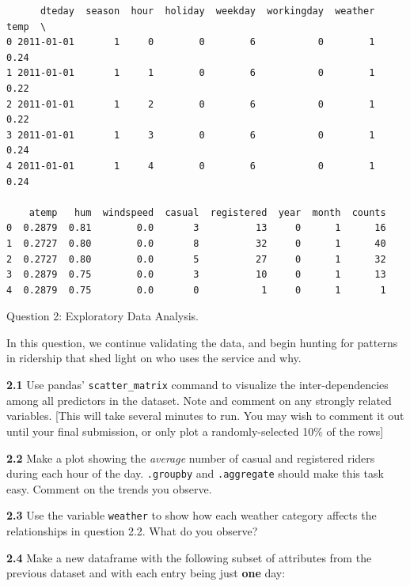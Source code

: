 \documentclass[11pt]{article}
\begin{document}
    
    \begin{verbatim}
      dteday  season  hour  holiday  weekday  workingday  weather  temp  \
0 2011-01-01       1     0        0        6           0        1  0.24   
1 2011-01-01       1     1        0        6           0        1  0.22   
2 2011-01-01       1     2        0        6           0        1  0.22   
3 2011-01-01       1     3        0        6           0        1  0.24   
4 2011-01-01       1     4        0        6           0        1  0.24   

    atemp   hum  windspeed  casual  registered  year  month  counts  
0  0.2879  0.81        0.0       3          13     0      1      16  
1  0.2727  0.80        0.0       8          32     0      1      40  
2  0.2727  0.80        0.0       5          27     0      1      32  
3  0.2879  0.75        0.0       3          10     0      1      13  
4  0.2879  0.75        0.0       0           1     0      1       1  
    \end{verbatim}

    
     Question 2: Exploratory Data Analysis.

In this question, we continue validating the data, and begin hunting for
patterns in ridership that shed light on who uses the service and why.

\textbf{2.1} Use pandas' \texttt{scatter\_matrix} command to visualize
the inter-dependencies among all predictors in the dataset. Note and
comment on any strongly related variables. {[}This will take several
minutes to run. You may wish to comment it out until your final
submission, or only plot a randomly-selected 10\% of the rows{]}

\textbf{2.2} Make a plot showing the \emph{average} number of casual and
registered riders during each hour of the day. \texttt{.groupby} and
\texttt{.aggregate} should make this task easy. Comment on the trends
you observe.

\textbf{2.3} Use the variable \texttt{weather} to show how each weather
category affects the relationships in question 2.2. What do you observe?

\textbf{2.4} Make a new dataframe with the following subset of
attributes from the previous dataset and with each entry being just
\textbf{one} day:
\end{document}
